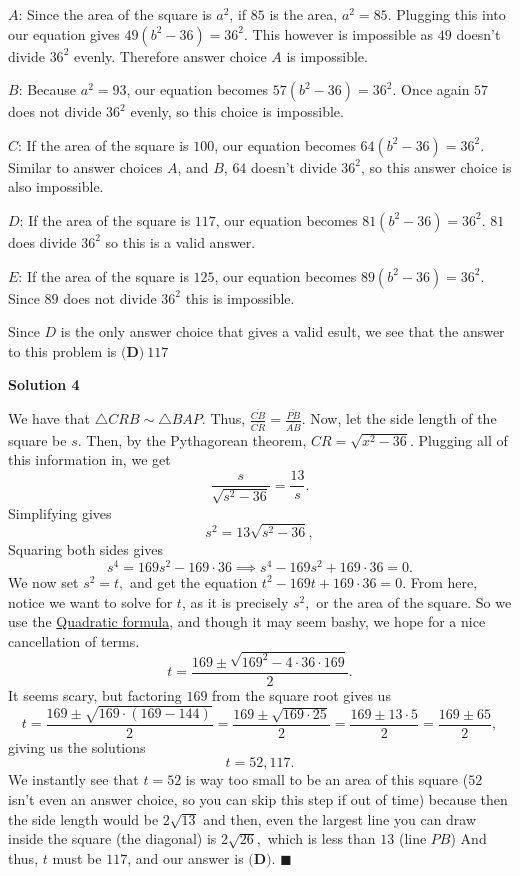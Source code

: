 \begin{enumerate}
 $A$: Since the area of the square is $a^2$, if $85$ is the area, $a^2=85$. Plugging this into our equation gives $49(b^2-36)=36^2$. This however is impossible as $49$ doesn't divide $36^2$ evenly. Therefore answer choice $A$ is impossible.

 
$B$: Because $a^2=93$, our equation becomes $57(b^2-36)=36^2$. Once again $57$ does not divide $36^2$ evenly, so this choice is impossible.

 
$C$: If the area of the square is $100$, our equation becomes $64(b^2-36)=36^2$. Similar to answer choices $A$, and $B$, $64$ doesn't divide $36^2$, so this answer choice is also impossible.

 
$D$: If the area of the square is $117$, our equation becomes $81(b^2-36)=36^2$. $81$ does divide $36^2$ so this is a valid answer.

 
$E$: If the area of the square is $125$, our equation becomes $89(b^2-36)=36^2$. Since $89$ does not divide $36^2$ this is impossible.

 
Since $D$ is the only answer choice that gives a valid esult, we see that the answer to this problem is $\boxed{\textbf{(D)}\ 117}$




\textbf{Solution 4}

We have that $\triangle CRB \sim \triangle BAP.$ Thus, $\frac{\overline{CB}}{\overline{CR}} = \frac{\overline{PB}}{\overline{AB}}$. Now, let the side length of the square be $s.$ Then, by the Pythagorean theorem, $CR = \sqrt{x^2-36}.$ Plugging all of this information in, we get 
 \[\frac{s}{\sqrt{s^2-36}} = \frac{13}{s}.\] Simplifying gives 
 \[s^2=13\sqrt{s^2-36},\] Squaring both sides gives 
 \[s^4 = 169s^2- 169\cdot 36 \implies s^4-169s^2 + 169\cdot 36 = 0.\] We now set $s^2=t,$ and get the equation $t^2-169t + 169\cdot 36 = 0.$ From here, notice we want to solve for $t$, as it is precisely $s^2,$ or the area of the square. So we use the \href{https://artofproblemsolving.com/wiki/index.php?title=Quadratic\_formula}{Quadratic formula}, and though it may seem bashy, we hope for a nice cancellation of terms. 
 \[t = \frac{169\pm\sqrt{169^2-4\cdot 36 \cdot 169}}{2}.\] It seems scary, but factoring $169$ from the square root gives us 
 \[t = \frac{169\pm \sqrt{169 \cdot (169-144)}}{2} = \frac{169 \pm \sqrt{169 \cdot 25}}{2} = \frac{169 \pm 13\cdot 5}{2} = \frac{169\pm 65}{2},\] giving us the solutions 
 \[t=52, 117.\] We instantly see that $t=52$ is way too small to be an area of this square ($52$ isn't even an answer choice, so you can skip this step if out of time) because then the side length would be $2\sqrt{13}$ and then, even the largest line you can draw inside the square (the diagonal)  is $2\sqrt{26},$ which is less than $13$ (line $PB$) And thus, $t$ must be $117$, and our answer is $\boxed{\textbf{(D)}}.$ $\blacksquare$





\end{enumerate}
